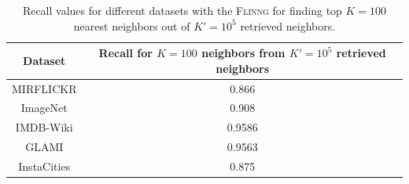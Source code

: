 \documentclass[sigconf, anonymous, review]{acmart}
\begin{document}
\begin{table}
    \centering
    \begin{tabular}{|c|c|}
    \hline \rowcolor{Gray}
         Dataset & Recall for $K=100$ neighbors from $K'=10^5$ retrieved neighbors \\\hline
         \textsf{MIRFLICKR} & 0.866\\\hline
         \textsf{ImageNet} & 0.908\\\hline
         \textsf{IMDB-Wiki} & 0.9586\\\hline
         \textsf{GLAMI} & 0.9563\\\hline
         \textsf{InstaCities} & 0.875\\\hline
    \end{tabular}
    \caption{Recall values for different datasets with the \textsc{Flinng} \cite{Engels2021} for finding top $K=100$ nearest neighbors out of $K'=10^5$ retrieved neighbors.}
    \label{tab:KNN_flinng}
\end{table}




\end{document}
